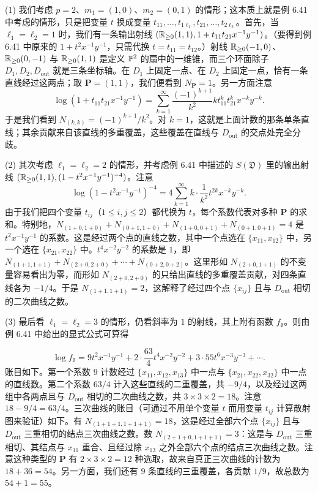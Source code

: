 \begin{examples}
(1) 我们考虑 $p=2$、$m_1=(1,0)$、$m_2=(0,1)$ 的情形；这本质上就是例 6.41 中考虑的情形，只是把变量 $t$ 换成变量 $t_{11},\dots,t_{1\ell_1},t_{21},\dots,t_{2\ell_2}$。首先，当 $\ell_1=\ell_2=1$ 时，我们有一条输出射线 $(\mathbb{R}_{\ge0}(1,1),1+t_{11}t_{21}x^{-1}y^{-1})$。（要得到例 6.41 中原来的 $1+t^2x^{-1}y^{-1}$，只需代换 $t=t_{11}=t_{12}$。）射线 $\mathbb{R}_{\ge0}(-1,0)$、$\mathbb{R}_{\ge0}(0,-1)$ 与 $\mathbb{R}_{\ge0}(1,1)$ 是定义 $\mathbb{P}^2$ 的扇中的一维锥，而三个环面除子 $D_1,D_2,D_{\mathrm{out}}$ 就是三条坐标轴。在 $D_1$ 上固定一点、在 $D_2$ 上固定一点，恰有一条直线经过这两点；取 $\mathbf{P}=(1,1)$，我们便看到 $N_{\mathbf{P}}=1$。另一方面注意
\[
\log(1+t_{11}t_{21}x^{-1}y^{-1})=\sum_{k=1}^\infty\frac{(-1)^{k+1}}{k^2}kt_{11}^kt_{21}^kx^{-k}y^{-k}.
\]
于是我们看到 $N_{(k,k)}=(-1)^{k+1}/k^2$。对 $k=1$，这就是上面计数的那条单条直线；其余贡献来自该直线的多重覆盖，这些覆盖在直线与 $D_{\mathrm{out}}$ 的交点处完全分歧。

(2) 其次考虑 $\ell_1=\ell_2=2$ 的情形，并考虑例 6.41 中描述的 $S(\mathfrak{D})$ 里的输出射线 $(\mathbb{R}_{\ge0}(1,1),(1-t^2x^{-1}y^{-1})^{-4})$。注意
\[
\log(1-t^2x^{-1}y^{-1})^{-4}=4\sum_{k=1}^\infty k\cdot\frac{1}{k^2}t^{2k}x^{-k}y^{-k}.
\]
由于我们把四个变量 $t_{ij}$（$1\le i,j\le2$）都代换为 $t$，每个系数代表对多种 $\mathbf{P}$ 的求和。特别地，$N_{(1+0,1+0)}+N_{(0+1,1+0)}+N_{(1+0,0+1)}+N_{(0+1,0+1)}=4$ 是 $t^2x^{-1}y^{-1}$ 的系数。这是经过两个点的直线之数，其中一个点选在 $\{x_{11},x_{12}\}$ 中，另一个选在 $\{x_{21},x_{22}\}$ 中。$t^4x^{-2}y^{-2}$ 的系数是 $1$，即 $N_{(1+1,1+1)}+N_{(2+0,2+0)}+\cdots+N_{(0+2,0+2)}$。这里形如 $N_{(2+0,1+1)}$ 的不变量容易看出为零，而形如 $N_{(2+0,2+0)}$ 的只给出直线的多重覆盖贡献，对四条直线各为 $-1/4$。于是 $N_{(1+1,1+1)}=2$，这解释了经过四个点 $\{x_{ij}\}$ 且与 $D_{\mathrm{out}}$ 相切的二次曲线之数。

(3) 最后看 $\ell_1=\ell_2=3$ 的情形，仍看斜率为 $1$ 的射线，其上附有函数 $f_{\mathfrak{d}}$。则由例 6.41 中给出的显式公式可算得

\[
\log f_{\mathfrak{d}}=9t^2x^{-1}y^{-1}+2\cdot\frac{63}{4}t^4x^{-2}y^{-2}+3\cdot55t^6x^{-3}y^{-3}+\cdots.
\]
账目如下。第一个系数 $9$ 计数经过 $\{x_{11},x_{12},x_{13}\}$ 中一点与 $\{x_{21},x_{22},x_{32}\}$ 中一点的直线数。第二个系数 $63/4$ 计入这些直线的二重覆盖，共 $-9/4$，以及经过这两组中各两点且与 $D_{\mathrm{out}}$ 相切的二次曲线之数，共 $3\times3\times2=18$。注意 $18-9/4=63/4$。三次曲线的账目（可通过不用单个变量 $t$ 而用变量 $t_{ij}$ 计算散射图来验证）如下。有 $N_{(1+1+1,1+1+1)}=18$，这是经过全部六个点 $\{x_{ij}\}$ 且与 $D_{\mathrm{out}}$ 三重相切的结点三次曲线之数。数 $N_{(2+1+0,1+1+1)}=3$：这是与 $D_{\mathrm{out}}$ 三重相切、其结点与 $x_{11}$ 重合、且经过除 $x_{13}$ 之外全部六个点的结点三次曲线之数。注意这种类型的 $\mathbf{P}$ 有 $2\times3\times2=12$ 种选取，故来自真正三次曲线的计数为 $18+36=54$。另一方面，我们还有 $9$ 条直线的三重覆盖，各贡献 $1/9$，故总数为 $54+1=55$。
\end{examples}


